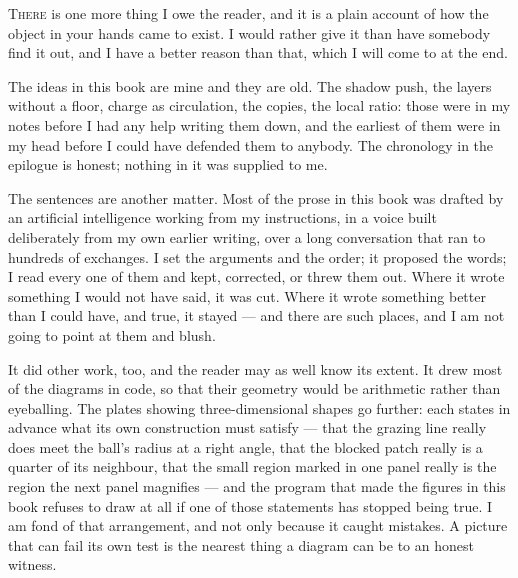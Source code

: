 \documentclass[fontsize=11pt,paper=a4,pagesize=auto,parskip=half-]{scrbook}
\newif\ifdraftnotes
\newcommand{\draftstatus}[1]{\ifdraftnotes{\small\itshape\color{black!60}#1\par}\fi\medskip}
\begin{document}
\draftstatus{Draft 1}

\lettrine{T}{here} is one more thing I owe the reader, and it is a plain account of how the object in your hands came to exist. I would rather give it than have somebody find it out, and I have a better reason than that, which I will come to at the end.

The ideas in this book are mine and they are old. The shadow push, the layers without a floor, charge as circulation, the copies, the local ratio: those were in my notes before I had any help writing them down, and the earliest of them were in my head before I could have defended them to anybody. The chronology in the epilogue is honest; nothing in it was supplied to me.

The sentences are another matter. Most of the prose in this book was drafted by an artificial intelligence working from my instructions, in a voice built deliberately from my own earlier writing, over a long conversation that ran to hundreds of exchanges. I set the arguments and the order; it proposed the words; I read every one of them and kept, corrected, or threw them out. Where it wrote something I would not have said, it was cut. Where it wrote something better than I could have, and true, it stayed --- and there are such places, and I am not going to point at them and blush.

It did other work, too, and the reader may as well know its extent. It drew most of the diagrams in code, so that their geometry would be arithmetic rather than eyeballing. The plates showing three-dimensional shapes go further: each states in advance what its own construction must satisfy --- that the grazing line really does meet the ball's radius at a right angle, that the blocked patch really is a quarter of its neighbour, that the small region marked in one panel really is the region the next panel magnifies --- and the program that made the figures in this book refuses to draw at all if one of those statements has stopped being true. I am fond of that arrangement, and not only because it caught mistakes. A picture that can fail its own test is the nearest thing a diagram can be to an honest witness.
\end{document}
